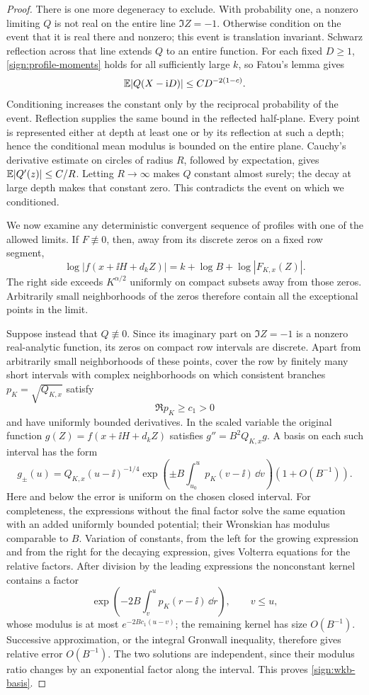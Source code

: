 \begin{proof}
There is one more degeneracy to exclude.  With probability one, a
nonzero limiting \(Q\) is not real on the entire line \(\Im Z=-1\).
Otherwise condition on the event that it is real there and nonzero;
this event is translation invariant.  Schwarz reflection across that
line extends \(Q\) to an entire function. For each fixed \(D\ge1\),
\eqref{sign:profile-moments} holds for all sufficiently large \(k\),
so Fatou's lemma gives
\[
 \mathbb E|Q(X-\mathrm i D)|\le C D^{-2(1-c)}.
\]
Conditioning increases the constant only by the reciprocal probability
of the event.  Reflection supplies the same bound in the reflected
half-plane.  Every point is represented either at depth at least one or
by its reflection at such a depth; hence the conditional mean modulus
is bounded on the entire plane.  Cauchy's derivative estimate on circles
of radius \(R\), followed by expectation, gives
\(\mathbb E|Q'(z)|\le C/R\).  Letting \(R\to\infty\) makes \(Q\) constant
almost surely; the decay at large depth makes that constant zero.  This
contradicts the event on which we conditioned.

We now examine any deterministic convergent sequence of profiles with
one of the allowed limits.  If \(F\not\equiv0\), then, away from its
discrete zeros on a fixed row segment,
\[
 \log|f(x+\ii H+d_kZ)|=k+\log B+\log|F_{K,x}(Z)|.
\]
The right side exceeds \(K^{\alpha/2}\) uniformly on compact subsets
away from those zeros.  Arbitrarily small neighborhoods of the zeros
therefore contain all the exceptional points in the limit.

Suppose instead that \(Q\not\equiv0\).  Since its imaginary part on
\(\Im Z=-1\) is a nonzero real-analytic function, its zeros on compact
row intervals are discrete.  Apart from arbitrarily small
neighborhoods of these points, cover the row by finitely many short
intervals with complex neighborhoods on which consistent branches
\(p_K=\sqrt{Q_{K,x}}\) satisfy
\[
 \Re p_K\ge c_1>0
\]
and have uniformly bounded derivatives.  In the scaled variable the
original function \(g(Z)=f(x+\ii H+d_kZ)\) satisfies
\(g''=B^2Q_{K,x}g\).  A basis on each such interval has the form
\begin{equation}\label{sign:wkb-basis}
 g_\pm(u)=Q_{K,x}(u-\ii)^{-1/4}
  \exp\left(\pm B\int_{u_0}^u p_K(v-\ii)\,\dd v\right)
  (1+O(B^{-1})).
\end{equation}
Here and below the error is uniform on the chosen closed interval.
For completeness, the expressions without the final factor solve the
same equation with an added uniformly bounded potential; their
Wronskian has modulus comparable to \(B\).  Variation of constants,
from the left for the growing expression and from the right for the
decaying expression, gives Volterra equations for the relative
factors.  After division by the leading expressions the nonconstant
kernel contains a factor
\[
 \exp\left(-2B\int_v^u p_K(r-\ii)\,\dd r\right),\qquad v\le u,
\]
whose modulus is at most \(e^{-2Bc_1(u-v)}\); the remaining kernel
has size \(O(B^{-1})\).  Successive approximation, or the integral
Gronwall inequality, therefore gives relative error \(O(B^{-1})\).
The two solutions are independent, since their modulus ratio changes
by an exponential factor along the interval.  This proves
\eqref{sign:wkb-basis}.


\end{proof}
